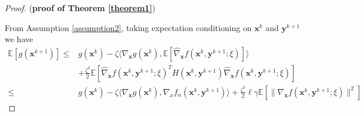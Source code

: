 \begin{proof} (\textbf{proof of Theorem \ref{theorem1}}) 

    From Assumption \ref{assumption2}, taking expectation conditioning on ${ \mathbf{x}}^k$ and ${ \mathbf{y}}^{k+1}$ we have
    \begin{align*}
        \mathbb{E}[g({ \mathbf{x}}^{k+1})] \leq & g({ \mathbf{x}}^k)-\zeta\langle \nabla_{ \mathbf{x}} g({ \mathbf{x}}^k),\mathbb{E}[\hat{\nabla}_{ \mathbf{x}} f({ \mathbf{x}}^k,{ \mathbf{y}}^{k+1};\xi)]\rangle\\
        &  + \frac{\zeta^2}{2} \mathbb{E}[\hat{\nabla}_{ \mathbf{x}} f({ \mathbf{x}}^k,{ \mathbf{y}}^{k+1};\xi)^T H({ \mathbf{x}}^k,{ \mathbf{y}}^{k+1})\hat{\nabla}_{ \mathbf{x}} f({ \mathbf{x}}^k,{ \mathbf{y}}^{k+1};\xi)] \\
        \leq & g({ \mathbf{x}}^k)-\zeta\langle \nabla_{ \mathbf{x}} g({ \mathbf{x}}^k),\nabla_xf_\alpha({ \mathbf{x}}^k,{ \mathbf{y}}^{k+1})\rangle + \frac{\zeta^2}{2}\ell\gamma \mathbb{E}[\|\nabla_{ \mathbf{x}} f({ \mathbf{x}}^k,{ \mathbf{y}}^{k+1};\xi)\|^2] 
    \end{align*}


\end{proof}
